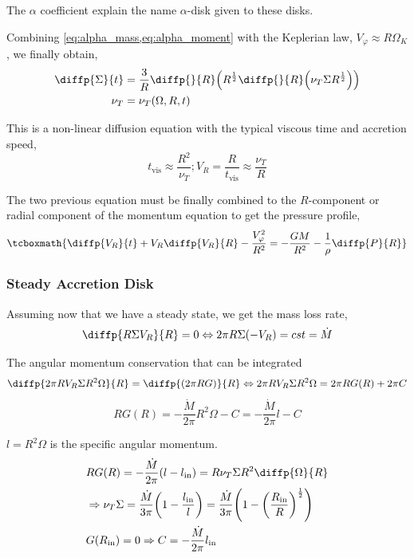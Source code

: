 \documentclass[10pt,a4paper,english]{article}
\let\originalleft\left
\let\originalright\right
\renewcommand{\left}{\mathopen{}\mathclose\bgroup\originalleft}
\renewcommand{\right}{\aftergroup\egroup\originalright}
\begin{document}
The $\alpha$ coefficient explain the name $\alpha$-disk given to these disks.

Combining \cref{eq:alpha_mass,eq:alpha_moment} with the Keplerian law,
$V_\varphi \approx R \Omega_K$, we finally obtain,
\begin{align*}
    \diffp{\Sigma}{t} &= \frac{3}{R} \diffp{}{R} \left( R^\frac{1}{2} \diffp{}{R} \left( \nu_T \Sigma R^\frac{1}{2} \right) \right) \\
    \nu_T &= \nu_T(\Omega,R,t)
\end{align*}

This is a non-linear diffusion equation with the typical viscous time and
accretion speed,
\begin{equation*}
    t_\mathrm{vis} \approx \frac{R^2}{\nu_T} ; V_R = \frac{R}{t_\mathrm{vis}} \approx \frac{\nu_T}{R}
\end{equation*}

The two previous equation must be finally combined to the $R$-component or
radial component of the momentum equation to get the pressure profile,
\begin{equation}
    \tcboxmath{
        \diffp{V_R}{t} + V_R \diffp{V_R}{R} - \frac{V_\varphi^2}{R^2} = - \frac{GM}{R^2} - \frac{1}{\rho} \diffp{P}{R}
    }
\end{equation}

\subsubsection{Steady Accretion Disk}

Assuming now that we have a steady state, we get the mass loss rate,
\begin{equation}
    \diffp{R \Sigma V_R}{R} = 0 \Leftrightarrow 2 \pi R \Sigma (- V_R) = cst = \dot{M}
\end{equation}

The angular momentum conservation that can be integrated
\begin{equation}
    \diffp{2 \pi R V_R \Sigma R^2 \Omega}{R} = \diffp{(2 \pi R G)}{R} \Leftrightarrow 2 \pi R V_R \Sigma R^2 \Omega = 2 \pi R G(R) + 2 \pi C
\end{equation}
\begin{equation*}
    R G(R) = - \frac{\dot{M}}{2 \pi} R^2 \Omega - C = - \frac{\dot{M}}{2 \pi} l - C
\end{equation*}

$l = R^2 \Omega$ is the specific angular momentum.
\begin{align*}
    & RG(R) = - \frac{\dot{M}}{2 \pi} (l - l_\mathrm{in}) = R \nu_T \Sigma R^2 \diffp{\Omega}{R} \\
    & \Rightarrow \nu_T \Sigma = \frac{\dot{M}}{3 \pi} \left(1 - \frac{l_\mathrm{in}}{l}\right) =
    \frac{\dot{M}}{3 \pi} \left(1 - \left(\frac{R_\mathrm{in}}{R}\right)^\frac{1}{2}\right) \\
    &G(R_\mathrm{in}) = 0 \Rightarrow C = - \frac{\dot{M}}{2 \pi} l_\mathrm{in}
\end{align*}
\end{document}
